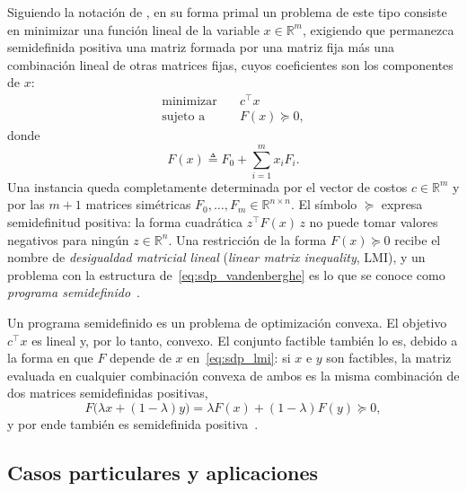 Siguiendo la notación de \textcite{vandenbergheSemidefiniteProgramming1996}, en su forma
primal un problema de este tipo consiste en minimizar una función lineal de la
variable $x \in \mathbb{R}^{m}$, exigiendo que permanezca semidefinida positiva una matriz
formada por una matriz fija más una combinación lineal de otras matrices fijas, cuyos
coeficientes son los componentes de $x$:
\begin{equation}
    \label{eq:sdp_vandenberghe}
    \begin{aligned}
        \text{minimizar}   \quad & c^\top x \\
        \text{sujeto a}    \quad & F(x) \succeq 0,
    \end{aligned}
\end{equation}
donde
\begin{equation}
    \label{eq:sdp_lmi}
    F(x) \triangleq F_0 + \sum_{i=1}^{m} x_i F_i .
\end{equation}
Una instancia queda completamente determinada por el vector de costos $c \in \mathbb{R}^m$ y
por las $m+1$ matrices simétricas $F_0, \ldots, F_m \in \mathbb{R}^{n \times n}$. El símbolo
$\succeq$ expresa semidefinitud positiva: la forma cuadrática $z^\top F(x)\, z$ no puede tomar
valores negativos para ningún $z \in \mathbb{R}^n$. Una restricción de la forma $F(x) \succeq 0$
recibe el nombre de \textit{desigualdad matricial lineal} (\textit{linear matrix inequality},
LMI), y un problema con la estructura de~\eqref{eq:sdp_vandenberghe} es lo que se conoce como
\textit{programa semidefinido}~\parencite{vandenbergheSemidefiniteProgramming1996}.

Un programa semidefinido es un problema de optimización convexa. El objetivo $c^\top x$ es lineal
y, por lo tanto, convexo. El conjunto factible también lo es, debido a la forma en que $F$
depende de $x$ en~\eqref{eq:sdp_lmi}: si $x$ e $y$ son factibles, la matriz evaluada en
cualquier combinación convexa de ambos es la misma combinación de dos matrices semidefinidas
positivas,
\[
    F\bigl(\lambda x + (1-\lambda) y\bigr) = \lambda F(x) + (1-\lambda) F(y) \succeq 0,
\]
y por ende también es semidefinida positiva~\parencite{vandenbergheSemidefiniteProgramming1996}.

\subsection{Casos particulares y aplicaciones}
\label{subsec:sdp_aplicaciones}

